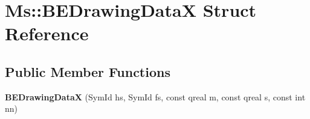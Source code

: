 \hypertarget{struct_ms_1_1_b_e_drawing_data_x}{}\section{Ms\+:\+:B\+E\+Drawing\+DataX Struct Reference}
\label{struct_ms_1_1_b_e_drawing_data_x}
\subsection*{Public Member Functions}
\begin{DoxyCompactItemize}
\item 
\mbox{\label{struct_ms_1_1_b_e_drawing_data_x_ac7a102bd9d51c3993030019d4a4e25ef}} 
{\bfseries B\+E\+Drawing\+DataX} (Sym\+Id hs, Sym\+Id fs, const qreal m, const qreal s, const int nn)
\end{DoxyCompactItemize}
